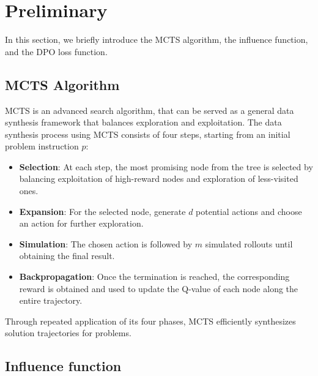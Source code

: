 \section{Preliminary}
\label{section:preliminary}
In this section, we briefly introduce the MCTS algorithm, the influence function, and the DPO loss function. 

\subsection{MCTS Algorithm}

MCTS is an advanced search algorithm, that can be served as a general data synthesis framework that balances exploration and exploitation. The data synthesis process using MCTS consists of four steps, starting from an initial problem instruction $p$:
\begin{itemize}[leftmargin=*]
    \item \textbf{Selection}: At each step, the most promising node from the tree is selected by balancing exploitation of high-reward nodes and exploration of less-visited ones. 
    \item \textbf{Expansion}: For the selected node, generate $d$ potential actions and choose an action for further exploration.
    \item \textbf{Simulation}: The chosen action is followed by 
     $m$ simulated rollouts until obtaining the final result.
    \item \textbf{Backpropagation}: Once the termination is reached, the corresponding reward is obtained and used to update the Q-value of each node along the entire trajectory.
\end{itemize}
Through repeated application of its four phases, MCTS efficiently synthesizes solution trajectories for problems.

\subsection{Influence function}

